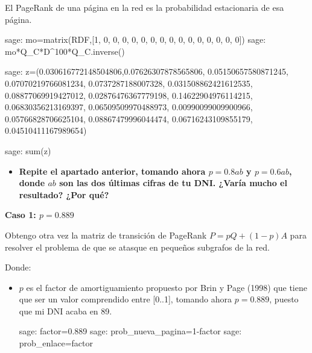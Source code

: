\par El PageRank de una página en la red es la probabilidad estacionaria de esa página.
    
\begin{sagecommandline}
    sage: mo=matrix(RDF,[1, 0, 0, 0, 0, 0, 0, 0, 0, 0, 0, 0, 0, 0, 0, 0])
    sage: mo*Q_C*D^100*Q_C.inverse()
\end{sagecommandline}

\begin{sagecommandline}
    sage: z=(0.030616772148504806,0.07626307878565806, 0.05150657580871245, 0.07070219766081234, 0.0737287188007328, 0.031508862421612535, 0.08877069919427012, 0.02876476367779198, 0.14622904976114215, 0.06830356213169397, 0.06509509970488973, 0.00990099009900966, 0.05766828706625104, 0.08867479996044474, 0.06716243109855179, 0.04510411167989654)
\end{sagecommandline}

\begin{sagecommandline}
    sage: sum(z)
\end{sagecommandline}

\begin{ejer}
    \begin{itemize}
        \item \textbf{Repite el apartado anterior, tomando ahora $p = 0.8ab$ y $p = 0.6ab$, donde $ab$ son las dos últimas cifras de tu DNI. ¿Varía mucho el resultado? ¿Por qué?}
    \end{itemize}
\end{ejer}
\par\textbf{Caso 1: $p = 0.889$}
\par Obtengo otra vez la matriz de transición de PageRank $P=pQ + (1-p)A$ para resolver el 
problema de que se atasque en pequeños subgrafos de la red.
\par Donde:
\begin{itemize}
    \item $p$ es el factor de amortiguamiento propuesto por Brin y Page (1998) que tiene que ser un valor 
    comprendido entre [0..1], tomando ahora $p = 0.889$, puesto que mi DNI acaba en 89.
    \begin{sagecommandline}
        sage: factor=0.889
        sage: prob_nueva_pagina=1-factor
        sage: prob_enlace=factor
    \end{sagecommandline}
\end{itemize}

